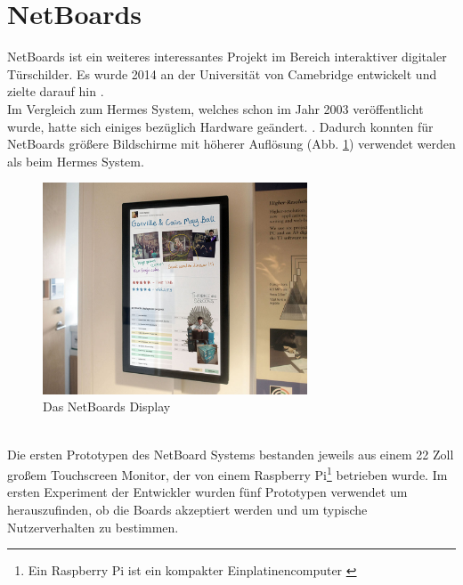 \section{NetBoards}
NetBoards\cite{wood:2014}\cite{netboards:website} ist ein weiteres interessantes Projekt im Bereich interaktiver digitaler Türschilder. Es wurde 2014 an der Universität von Camebridge entwickelt und zielte darauf hin \cite{wood:2014}.\\
Im Vergleich zum Hermes System, welches schon im Jahr 2003 veröffentlicht wurde, hatte sich einiges bezüglich Hardware geändert. \cite{wood:2014}.
Dadurch konnten für NetBoards größere Bildschirme mit höherer Auflösung (Abb. \ref{img:netBoardsDisplay}) verwendet werden als beim Hermes System.
\begin{figure}[h!]
  \centering
    \includegraphics[width=0.7\textwidth]{./img/netBoards_display.png}
  \caption{Das NetBoards Display\cite{wood:2014}}
  \label{img:netBoardsDisplay}
\end{figure}
\\
Die ersten Prototypen des NetBoard Systems bestanden jeweils aus einem 22 Zoll großem Touchscreen Monitor, der von einem Raspberry Pi\footnote{Ein Raspberry Pi ist ein kompakter Einplatinencomputer \cite{raspberrypi:website}} betrieben wurde.
Im ersten Experiment der Entwickler wurden fünf Prototypen verwendet um herauszufinden, ob die Boards akzeptiert werden und um typische Nutzerverhalten zu bestimmen.
\cite{wood:2014}
